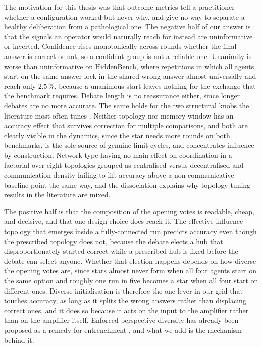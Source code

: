 The motivation for this thesis was that outcome metrics tell a practitioner
whether a configuration worked but never why, and give no way to separate a
healthy deliberation from a pathological one. The
negative half of our answer is that the signals an operator would naturally reach
for instead are uninformative or inverted. Confidence rises monotonically across
rounds whether the final answer is correct or not, so a confident group is not a
reliable one. Unanimity is worse than uninformative on HiddenBench, where
repetitions in which all agents start on the same answer lock in the shared
wrong answer almost universally and reach only $2.5\,\%$, because a unanimous
start leaves nothing for the exchange that the benchmark requires. Debate length is no reassurance either, since longer debates
are no more accurate. The same holds for the two structural knobs the literature
most often tunes \citep{li2024sparsetopology, mehdizadeh2026topologymemory}. Neither
topology nor memory window has an accuracy effect that survives correction for
multiple comparisons, and both are clearly visible in the dynamics, since the
star needs more rounds on both benchmarks, is the sole source of genuine limit
cycles, and concentrates influence by construction. Network type having no main
effect on coordination in a factorial over eight topologies grouped as centralised
versus decentralised \citep{mehdizadeh2026topologymemory} and communication density failing to lift
accuracy above a non-communicative baseline \citep{bertalanic2026costofconsensus}
point the same way, and the dissociation explains why topology tuning results in
the literature are mixed.

The positive half is that the composition of the opening votes is readable,
cheap, and decisive, and that one design choice does reach it. The effective
influence topology that emerges inside a fully-connected run predicts accuracy
even though the prescribed topology does not, because the debate elects a hub
that disproportionately started correct while a prescribed hub is fixed before
the debate can select anyone. Whether that election happens depends on how
diverse the opening votes are, since stars almost never form when all four agents
start on the same option and roughly one run in five becomes a star when all four
start on different ones. Diverse initialisation is therefore the one lever in our
grid that touches accuracy, as long as it splits the wrong answers rather than
displacing correct ones, and it does so because it acts on the input to the
amplifier rather than on the amplifier itself. Enforced perspective diversity has
already been proposed as a remedy for entrenchment \citep{oh2026entrenchment},
and what we add is the mechanism behind it.

